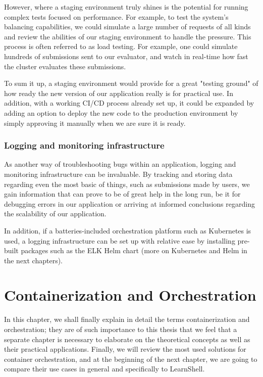 \documentclass[thesis=B,english]{FITthesis}[2019/12/23]
\begin{document}
However, where a staging environment truly shines is the potential for running complex tests focused on performance. For example, to test the system's balancing capabilities, we could simulate a large number of requests of all kinds and review the abilities of our staging environment to handle the pressure. This process is often referred to as load testing. For example, one could simulate hundreds of submissions sent to our evaluator, and watch in real-time how fast the cluster evaluates these submissions.

To sum it up, a staging environment would provide for a great "testing ground" of how ready the new version of our application really is for practical use. In addition, with a working CI/CD process already set up, it could be expanded by adding an option to deploy the new code to the production environment by simply approving it manually when we are sure it is ready.

\subsection{Logging and monitoring infrastructure}

As another way of troubleshooting bugs within an application, logging and monitoring infrastructure can be invaluable. By tracking and storing data regarding even the most basic of things, such as submissions made by users, we gain information that can prove to be of great help in the long run, be it for debugging errors in our application or arriving at informed conclusions regarding the scalability of our application.

In addition, if a batteries-included orchestration platform such as Kubernetes is used, a logging infrastructure can be set up with relative ease by installing pre-built packages such as the ELK Helm chart (more on Kubernetes and Helm in the next chapters).


\chapter{Containerization and Orchestration}

In this chapter, we shall finally explain in detail the terms containerization and orchestration; they are of such importance to this thesis that we feel that a separate chapter is necessary to elaborate on the theoretical concepts as well as their practical applications. Finally, we will review the most used solutions for container orchestration, and at the beginning of the next chapter, we are going to compare their use cases in general and specifically to LearnShell.
\end{document}
